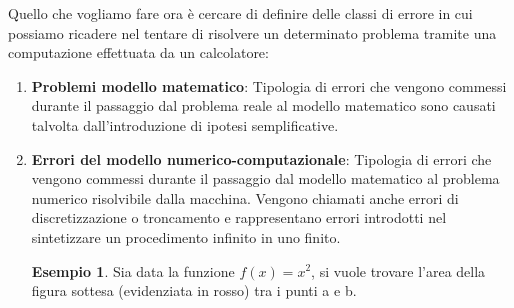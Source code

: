 \documentclass[12pt, a4paper]{book}
\theoremstyle{definition}
\newtheorem{exmp}{Esempio}[section]
\begin{document}
\begin{flushleft}

Quello che vogliamo fare ora è cercare di definire delle classi di errore in cui possiamo ricadere nel tentare di risolvere un determinato problema tramite una computazione effettuata da un calcolatore:

\begin{enumerate}
  \item \textbf{Problemi modello matematico}: Tipologia di errori che vengono commessi durante il passaggio dal problema reale al modello matematico sono causati talvolta dall'introduzione di ipotesi semplificative. 
  
  	\begin{figure}[h]
		\centering
	\end{figure}

\item \textbf{Errori del modello numerico-computazionale}: Tipologia di errori che vengono commessi durante il passaggio dal modello matematico al  problema numerico risolvibile dalla macchina. Vengono chiamati anche errori di discretizzazione o troncamento e rappresentano errori introdotti nel sintetizzare un procedimento infinito in uno finito.

\begin{figure}[h!]
		\centering
	\end{figure}
\begin{exmp}
Sia data la funzione $ f(x) = x^2 $, si vuole trovare l'area della figura sottesa (evidenziata in rosso) tra i punti a e b.\\


\end{exmp}
\end{enumerate}
\end{flushleft}
\end{document}
